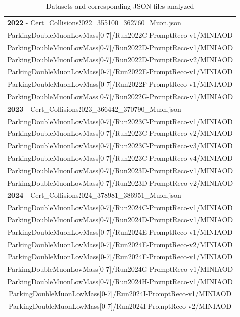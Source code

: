 \documentclass[10pt,twocolumn]{article}
\begin{document}
\begin{table}[h!]
    \centering
    \caption{Datasets and corresponding JSON files analyzed\\}
    \label{tab:dataset}
    \begin{tabular}{c}
    \toprule
     \multicolumn{1}{l}{\textbf{2022} - Cert\_Collisions2022\_355100\_362760\_Muon.json}\\
     ParkingDoubleMuonLowMass[0-7]/Run2022C-PromptReco-v1/MINIAOD\\
     ParkingDoubleMuonLowMass[0-7]/Run2022D-PromptReco-v1/MINIAOD\\
     ParkingDoubleMuonLowMass[0-7]/Run2022D-PromptReco-v2/MINIAOD\\
     ParkingDoubleMuonLowMass[0-7]/Run2022E-PromptReco-v1/MINIAOD\\
     ParkingDoubleMuonLowMass[0-7]/Run2022F-PromptReco-v1/MINIAOD\\
     ParkingDoubleMuonLowMass[0-7]/Run2022G-PromptReco-v1/MINIAOD\\
     \midrule
     \multicolumn{1}{l}{\textbf{2023} - Cert\_Collisions2023\_366442\_370790\_Muon.json}\\
     ParkingDoubleMuonLowMass[0-7]/Run2023C-PromptReco-v1/MINIAOD\\
     ParkingDoubleMuonLowMass[0-7]/Run2023C-PromptReco-v2/MINIAOD\\
     ParkingDoubleMuonLowMass[0-7]/Run2023C-PromptReco-v3/MINIAOD\\
     ParkingDoubleMuonLowMass[0-7]/Run2023C-PromptReco-v4/MINIAOD\\
     ParkingDoubleMuonLowMass[0-7]/Run2023D-PromptReco-v1/MINIAOD\\
     ParkingDoubleMuonLowMass[0-7]/Run2023D-PromptReco-v2/MINIAOD\\
     \midrule
     \multicolumn{1}{l}{\textbf{2024} - Cert\_Collisions2024\_378981\_386951\_Muon.json}\\
     ParkingDoubleMuonLowMass[0-7]/Run2024C-PromptReco-v1/MINIAOD\\
     ParkingDoubleMuonLowMass[0-7]/Run2024D-PromptReco-v1/MINIAOD\\
     ParkingDoubleMuonLowMass[0-7]/Run2024E-PromptReco-v1/MINIAOD\\
     ParkingDoubleMuonLowMass[0-7]/Run2024E-PromptReco-v2/MINIAOD\\
     ParkingDoubleMuonLowMass[0-7]/Run2024F-PromptReco-v1/MINIAOD\\
     ParkingDoubleMuonLowMass[0-7]/Run2024G-PromptReco-v1/MINIAOD\\
     ParkingDoubleMuonLowMass[0-7]/Run2024H-PromptReco-v1/MINIAOD\\
     ParkingDoubleMuonLowMass[0-7]/Run2024I-PromptReco-v1/MINIAOD\\
     ParkingDoubleMuonLowMass[0-7]/Run2024I-PromptReco-v2/MINIAOD\\
     \bottomrule
    \end{tabular}
\end{table}
\end{document}
